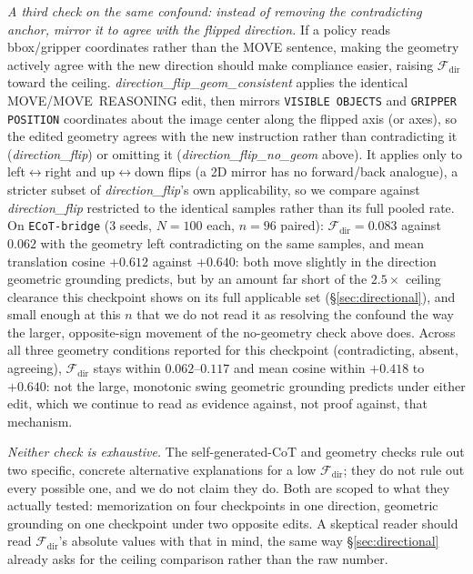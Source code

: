 \emph{A third check on the same confound: instead of removing the contradicting anchor, mirror it to agree with the flipped direction.} If a policy reads bbox/gripper coordinates rather than the MOVE sentence, making the geometry actively agree with the new direction should make compliance easier, raising $\mathcal{F}_{\text{dir}}$ toward the ceiling. \emph{direction\_flip\_geom\_consistent} applies the identical MOVE/MOVE~REASONING edit, then mirrors \texttt{VISIBLE OBJECTS} and \texttt{GRIPPER POSITION} coordinates about the image center along the flipped axis (or axes), so the edited geometry agrees with the new instruction rather than contradicting it (\emph{direction\_flip}) or omitting it (\emph{direction\_flip\_no\_geom} above). It applies only to left$\leftrightarrow$right and up$\leftrightarrow$down flips (a 2D mirror has no forward/back analogue), a stricter subset of \emph{direction\_flip}'s own applicability, so we compare against \emph{direction\_flip} restricted to the identical samples rather than its full pooled rate. On \texttt{ECoT-bridge} (3 seeds, $N{=}100$ each, $n{=}96$ paired): $\mathcal{F}_{\text{dir}} = 0.083$ against $0.062$ with the geometry left contradicting on the same samples, and mean translation cosine $+0.612$ against $+0.640$: both move slightly in the direction geometric grounding predicts, but by an amount far short of the $2.5\times$ ceiling clearance this checkpoint shows on its full applicable set (\S\ref{sec:directional}), and small enough at this $n$ that we do not read it as resolving the confound the way the larger, opposite-sign movement of the no-geometry check above does. Across all three geometry conditions reported for this checkpoint (contradicting, absent, agreeing), $\mathcal{F}_{\text{dir}}$ stays within $0.062$--$0.117$ and mean cosine within $+0.418$ to $+0.640$: not the large, monotonic swing geometric grounding predicts under either edit, which we continue to read as evidence against, not proof against, that mechanism.

\emph{Neither check is exhaustive.} The self-generated-CoT and geometry checks rule out two specific, concrete alternative explanations for a low $\mathcal{F}_{\text{dir}}$; they do not rule out every possible one, and we do not claim they do. Both are scoped to what they actually tested: memorization on four checkpoints in one direction, geometric grounding on one checkpoint under two opposite edits. A skeptical reader should read $\mathcal{F}_{\text{dir}}$'s absolute values with that in mind, the same way \S\ref{sec:directional} already asks for the ceiling comparison rather than the raw number.

